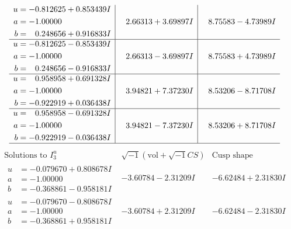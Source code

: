 \documentclass[1p]{elsarticle_modified}
\theoremstyle{definition}
\newcommand{\I}{\sqrt{-1}}
\begin{document}
$$\begin{array}{c|c|c}
\begin{aligned}
u &= -0.812625 + 0.853439 I \\
a &= -1.00000\phantom{ +0.000000I} \\
b &= \phantom{-}0.248656 + 0.916833 I\end{aligned}
 & \phantom{-}2.66313 + 3.69897 I & \phantom{-}8.75583 - 4.73989 I \\ \hline\begin{aligned}
u &= -0.812625 - 0.853439 I \\
a &= -1.00000\phantom{ +0.000000I} \\
b &= \phantom{-}0.248656 - 0.916833 I\end{aligned}
 & \phantom{-}2.66313 - 3.69897 I & \phantom{-}8.75583 + 4.73989 I \\ \hline\begin{aligned}
u &= \phantom{-}0.958958 + 0.691328 I \\
a &= -1.00000\phantom{ +0.000000I} \\
b &= -0.922919 + 0.036438 I\end{aligned}
 & \phantom{-}3.94821 + 7.37230 I & \phantom{-}8.53206 - 8.71708 I \\ \hline\begin{aligned}
u &= \phantom{-}0.958958 - 0.691328 I \\
a &= -1.00000\phantom{ +0.000000I} \\
b &= -0.922919 - 0.036438 I\end{aligned}
 & \phantom{-}3.94821 - 7.37230 I & \phantom{-}8.53206 + 8.71708 I\\
 \hline 
 \end{array}$$\newpage$$\begin{array}{c|c|c}  
\text{Solutions to }I^u_{3}& \I (\text{vol} + \sqrt{-1}CS) & \text{Cusp shape}\\
 \hline 
\begin{aligned}
u &= -0.079670 + 0.808678 I \\
a &= -1.00000\phantom{ +0.000000I} \\
b &= -0.368861 - 0.958181 I\end{aligned}
 & -3.60784 - 2.31209 I & -6.62484 + 2.31830 I \\ \hline\begin{aligned}
u &= -0.079670 - 0.808678 I \\
a &= -1.00000\phantom{ +0.000000I} \\
b &= -0.368861 + 0.958181 I\end{aligned}
 & -3.60784 + 2.31209 I & -6.62484 - 2.31830 I \\ \hline\begin{aligned}

\end{aligned}
\end{array}$$
\end{document}
